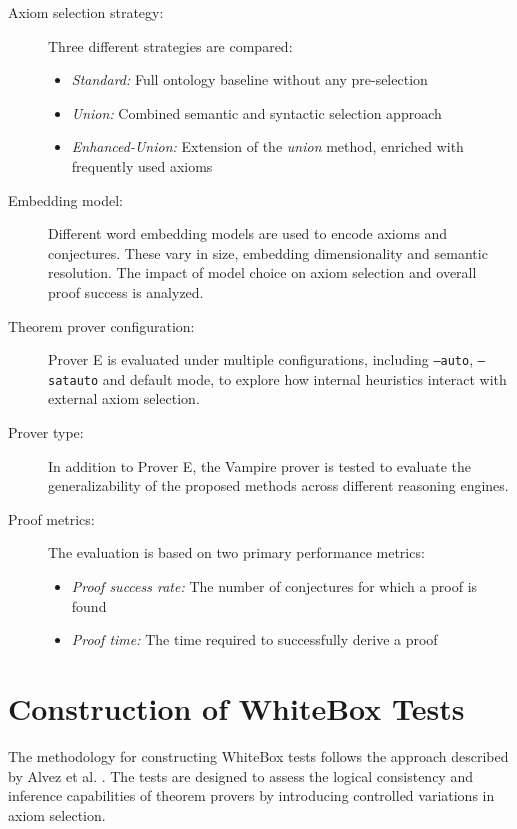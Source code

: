 \documentclass[english,version-2020-11]{uzl-thesis}
\begin{document}
\begin{description}
    \item[Axiom selection strategy:] Three different strategies are compared:
    \begin{itemize}
        \item \textit{Standard:} Full ontology baseline without any pre-selection
        \item \textit{Union:} Combined semantic and syntactic selection approach
        \item \textit{Enhanced-Union:} Extension of the \textit{union} method, enriched with frequently used axioms
    \end{itemize}
    
    \item[Embedding model:] Different word embedding models are used to encode axioms and conjectures. These vary in size, embedding dimensionality and semantic resolution. The impact of model choice on axiom selection and overall proof success is analyzed.

    \item[Theorem prover configuration:] Prover E is evaluated under multiple configurations, including \texttt{--auto}, \texttt{--satauto} and default mode, to explore how internal heuristics interact with external axiom selection.

    \item[Prover type:] In addition to Prover E, the Vampire prover is tested to evaluate the generalizability of the proposed methods across different reasoning engines.

    \item[Proof metrics:] The evaluation is based on two primary performance metrics:
    \begin{itemize}
        \item \textit{Proof success rate:} The number of conjectures for which a proof is found
        \item \textit{Proof time:} The time required to successfully derive a proof
    \end{itemize}
\end{description}

\section{Construction of WhiteBox Tests}

The methodology for constructing WhiteBox tests follows the approach described by Alvez et al. \cite{Alvez2017}. The tests are designed to assess the logical consistency and inference capabilities of theorem provers by introducing controlled variations in axiom selection.
\end{document}
